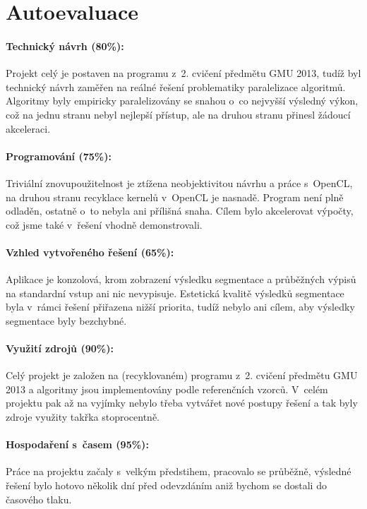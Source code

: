 \documentclass[11pt,a4paper]{article}
\begin{document}
\section{Autoevaluace}
\paragraph{Technický návrh (80\%):}
Projekt celý je postaven na programu z~2. cvičení předmětu GMU 2013, tudíž byl technický návrh zaměřen na reálné řešení problematiky paralelizace algoritmů. Algoritmy byly empiricky paralelizovány se snahou o~co nejvyšší výsledný výkon, což na jednu stranu nebyl nejlepší přístup, ale na druhou stranu přinesl žádoucí akceleraci.

\paragraph{Programování (75\%):}
Triviální znovupoužitelnost je ztížena neobjektivitou návrhu a práce s~OpenCL, na druhou stranu recyklace kernelů v~OpenCL je nasnadě. Program není plně odladěn, ostatně o~to nebyla ani přílišná snaha. Cílem bylo akcelerovat výpočty, což jsme také v~řešení vhodně demonstrovali.

\paragraph{Vzhled vytvořeného řešení (65\%):}
Aplikace je konzolová, krom zobrazení výsledku segmentace a průběžných výpisů na standardní vstup ani nic nevypisuje. Estetická kvalitě výsledků segmentace byla v~rámci řešení přiřazena nižší priorita, tudíž nebylo ani cílem, aby výsledky segmentace byly bezchybné.

\paragraph{Využití zdrojů (90\%):}
Celý projekt je založen na (recyklovaném) programu z~2. cvičení předmětu GMU 2013 a algoritmy jsou implementovány podle referenčních vzorců. V~celém projektu pak až na vyjímky nebylo třeba vytvářet nové postupy řešení a tak byly zdroje využity takřka stoprocentně.

\paragraph{Hospodaření s~časem (95\%):}
Práce na projektu začaly s~velkým předstihem, pracovalo se průběžně, výsledné řešení bylo hotovo několik dní před odevzdáním aniž bychom se dostali do časového tlaku.
\end{document}
